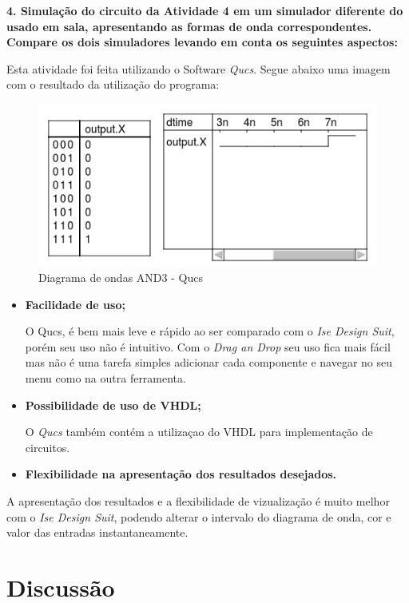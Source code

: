 \documentclass[12pts]{article}
\begin{document}
\singlespacing
\textbf{4. Simulação do circuito da Atividade 4 em um simulador diferente do usado em sala, apresentando as formas de onda correspondentes. Compare os dois simuladores levando em conta os seguintes aspectos:}
\singlespacing

	Esta atividade foi feita utilizando o Software \textit{Qucs}. Segue abaixo uma imagem com o resultado da utilização do programa:
	
\begin{figure}[!htb]
  \centering
  \includegraphics[scale=1]{qucs}
  \caption{Diagrama de ondas AND3 - Qucs}
  \label{figRotulo}
\end{figure}
	
	
\begin{itemize}
	\item \textbf{Facilidade de uso;}
	
	O Qucs, é bem mais leve e rápido ao ser comparado com o \textit{Ise Design Suit}, porém seu uso não é intuitivo. Com o \textit{Drag an Drop} seu uso fica mais fácil mas não é uma tarefa simples adicionar cada componente e navegar no seu menu como na outra ferramenta.
	
	\item \textbf{Possibilidade de uso de VHDL;}
	
	O \textit{Qucs} também contém a utilizaçao do VHDL para implementação de circuitos.
	
	\item \textbf{Flexibilidade na apresentação dos resultados desejados.}
\end{itemize}

	A apresentação dos resultados e a flexibilidade de vizualização é muito melhor com o \textit{Ise Design Suit}, podendo alterar o intervalo do diagrama de onda, cor e valor das entradas instantaneamente.


\section{Discussão}

\end{document}
